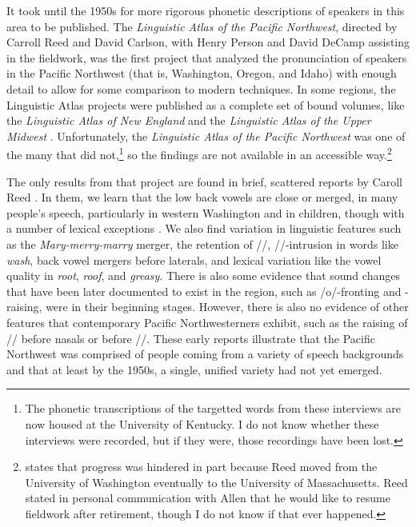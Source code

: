 It took until the 1950s for more rigorous phonetic descriptions of speakers in this area to be published. The \textit{Linguistic Atlas of the Pacific Northwest}, directed by Carroll Reed and David Carlson, with Henry Person and David DeCamp assisting in the fieldwork, was the first project that analyzed the pronunciation of speakers in the Pacific Northwest (that is, Washington, Oregon, and Idaho) with enough detail to allow for some comparison to modern techniques. In some regions, the Linguistic Atlas projects were published as a complete set of bound volumes, like the \textit{Linguistic Atlas of New England} \citep{kurath_1939_lane} and the \textit{Linguistic Atlas of the Upper Midwest} \citep{allen_1973_laum}. Unfortunately, the \textit{Linguistic Atlas of the Pacific Northwest} was one of the many that did not,\footnote{The phonetic transcriptions of the targetted words from these interviews are now housed at the University of Kentucky. I do not know whether these interviews were recorded, but if they were, those recordings have been lost.} so the findings are not available in an accessible way.\footnote{\citet[186]{allen_1977} states that progress was hindered in part because Reed moved from the University of Washington eventually to the University of Massachusetts. Reed stated in personal communication with Allen that he would like to resume fieldwork after retirement, though I do not know if that ever happened.}

The only results from that project are found in brief, scattered reports by Caroll Reed \citeyearpar{reed_1952, reed_1956, reed_1957, reed_1961, reed_1967}. In them, we learn that the low back vowels are close or merged, in many people's speech, particularly in western Washington and in children, though with a number of lexical exceptions \citeyearpar[Reed][]{reed_1952}. We also find variation in linguistic features such as the \textit{Mary-merry-marry} merger, the retention of //, //-intrusion in words like \textit{wash}, back vowel mergers before laterals, and lexical variation like the vowel quality in \textit{root}, \textit{roof}, and \textit{greasy}. There is also some evidence that sound changes that have been later documented to exist in the region, such as /o/-fronting and \beg-raising, were in their beginning stages. However, there is also no evidence of other features that contemporary Pacific Northwesterners exhibit, such as the raising of /\textipa{\ae}/ before nasals or before //. These early reports illustrate that the Pacific Northwest was comprised of people coming from a variety of speech backgrounds and that at least by the 1950s, a single, unified variety had not yet emerged.

